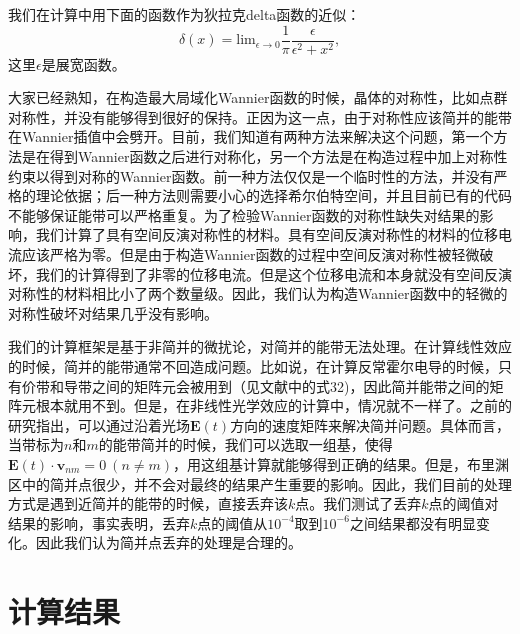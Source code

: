 我们在计算中用下面的函数作为狄拉克delta函数的近似：
\[
\delta(x) = \text{lim}_{\epsilon\to0}\frac{1}{\pi}\frac{\epsilon}{\epsilon^{2}+x^{2}},
\]
这里$\epsilon$是展宽函数。

大家已经熟知，在构造最大局域化Wannier函数的时候，晶体的对称性，比如点群对称性，并没有能够得到很好的保持。正因为这一点，由于对称性应该简并的能带在Wannier插值中会劈开。目前，我们知道有两种方法来解决这个问题，第一个方法是在得到Wannier函数之后进行对称化，另一个方法是在构造过程中加上对称性约束以得到对称的Wannier函数。前一种方法仅仅是一个临时性的方法，并没有严格的理论依据；后一种方法则需要小心的选择希尔伯特空间，并且目前已有的代码不能够保证能带可以严格重复。为了检验Wannier函数的对称性缺失对结果的影响，我们计算了具有空间反演对称性的材料。具有空间反演对称性的材料的位移电流应该严格为零。但是由于构造Wannier函数的过程中空间反演对称性被轻微破坏，我们的计算得到了非零的位移电流。但是这个位移电流和本身就没有空间反演对称性的材料相比小了两个数量级。因此，我们认为构造Wannier函数中的轻微的对称性破坏对结果几乎没有影响。

我们的计算框架是基于非简并的微扰论，对简并的能带无法处理。在计算线性效应的时候，简并的能带通常不回造成问题。比如说，在计算反常霍尔电导的时候，只有价带和导带之间的矩阵元会被用到（见文献中的式32)，因此简并能带之间的矩阵元根本就用不到。但是，在非线性光学效应的计算中，情况就不一样了。之前的研究指出，可以通过沿着光场$\mathbf{E}(t)$方向的速度矩阵来解决简并问题。具体而言，当带标为$n$和$m$的能带简并的时候，我们可以选取一组基，使得$\mathbf{E}(t)\cdot\mathbf{v}_{nm}=0  \ (n\ne m)$\cite{sipe_second-order_2000}，用这组基计算就能够得到正确的结果。但是，布里渊区中的简并点很少，并不会对最终的结果产生重要的影响。因此，我们目前的处理方式是遇到近简并的能带的时候，直接丢弃该$k$点。我们测试了丢弃$k$点的阈值对结果的影响，事实表明，丢弃$k$点的阈值从$10^{-4}$取到$10^{-6}$之间结果都没有明显变化。因此我们认为简并点丢弃的处理是合理的。

\section{计算结果}


